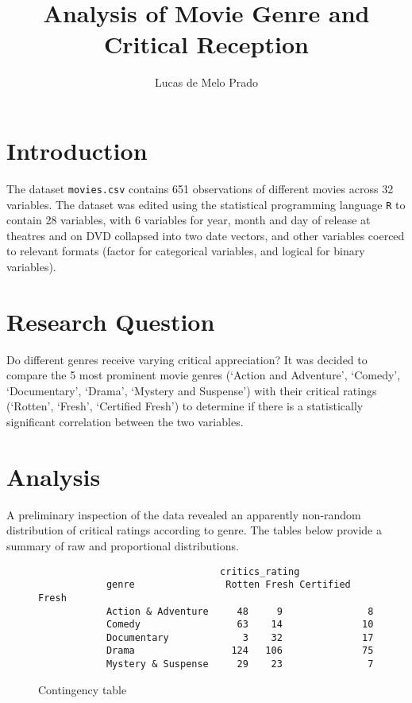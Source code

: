 \documentclass[12pt,a4paper]{article}
\author{Lucas de Melo Prado}
\title{Analysis of Movie Genre and Critical Reception}
\begin{document}
	\maketitle
	
	\section*{Introduction}
	
	The dataset {\tt movies.csv} contains 651 observations of different movies across 32 variables. The dataset was edited using the statistical programming language {\tt R} to contain 28 variables, with 6 variables for year, month and day of release at theatres and on DVD collapsed into two date vectors, and other variables coerced to relevant formats (factor for categorical variables, and logical for binary variables). 
	
	\section*{Research Question}
	
	Do different genres receive varying critical appreciation? It was decided to compare the 5 most prominent movie genres (`Action and Adventure', `Comedy', `Documentary', `Drama', `Mystery and Suspense') with their critical ratings (`Rotten', `Fresh', `Certified Fresh') to determine if there is a statistically significant correlation between the two variables.
	
	\section*{Analysis}
	
	A preliminary inspection of the data revealed an apparently non-random distribution of critical ratings according to genre. The tables below provide a summary of raw and proportional distributions.
	
	\begin{figure}[h!]
		\begin{verbatim}
			                    critics_rating
			genre                Rotten Fresh Certified Fresh
			Action & Adventure     48     9               8
			Comedy                 63    14              10
			Documentary             3    32              17
			Drama                 124   106              75
			Mystery & Suspense     29    23               7
		\end{verbatim}
		\caption{\footnotesize Contingency table}
	\end{figure}
	
\end{document}
